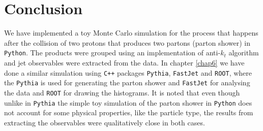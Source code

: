 \chapter{Conclusion}

We have implemented a toy Monte Carlo simulation for the process that happens after the collision of two protons that produces two partons (parton shower) in \verb+Python+. The products were grouped using an implementation of anti-$k_t$ algorithm and jet observables were extracted from the data. In chapter \ref{chap6} we have done a similar simulation  using \verb!C++! packages \verb+Pythia+, \verb+FastJet+ and \verb+ROOT+, where the \verb+Pythia+ is used for generating the parton shower and \verb+FastJet+ for analysing the data and \verb+ROOT+ for drawing the histograms. It is noted that even though unlike in \verb+Pythia+ the simple toy simulation of the parton shower in \verb+Python+ does not account for some physical properties, like the particle type, the results from extracting the observables were qualitatively close in both cases.      